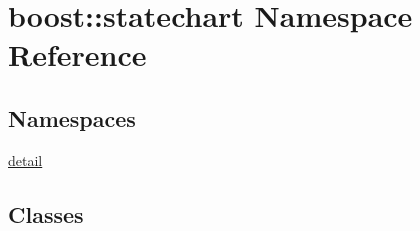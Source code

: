 \hypertarget{namespaceboost_1_1statechart}{}\section{boost\+:\+:statechart Namespace Reference}
\label{namespaceboost_1_1statechart}
\subsection*{Namespaces}
\begin{DoxyCompactItemize}
\item 
 \mbox{\hyperlink{namespaceboost_1_1statechart_1_1detail}{detail}}
\end{DoxyCompactItemize}
\subsection*{Classes}
